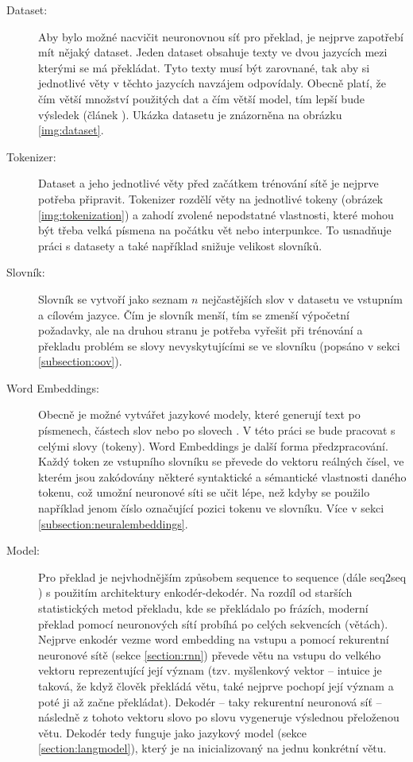 \begin{description}
  \item[Dataset:] Aby bylo možné nacvičit neuronovnou síť pro překlad, je nejprve zapotřebí mít nějaký dataset. Jeden dataset obsahuje texty ve dvou jazycích mezi kterými se má překládat. Tyto texty musí být zarovnané, tak aby si jednotlivé věty v těchto jazycích navzájem odpovídaly. Obecně platí, že čím větší množství použitých dat a čím větší model, tím lepší bude výsledek (článek \cite{googleLimits}). Ukázka datasetu je znázorněna na obrázku \ref{img:dataset}.

  \item[Tokenizer:] Dataset a jeho jednotlivé věty před začátkem trénování sítě je nejprve potřeba připravit. Tokenizer rozdělí věty na jednotlivé tokeny (obrázek \ref{img:tokenization}) a zahodí zvolené nepodstatné vlastnosti, které mohou být třeba velká písmena na počátku vět nebo interpunkce. To usnadňuje práci s datasety a také například snižuje velikost slovníků.

  \item[Slovník:] Slovník se vytvoří jako seznam $n$ nejčastějších slov v datasetu ve vstupním a cílovém jazyce. Čím je slovník menší, tím se zmenší výpočetní požadavky, ale na druhou stranu je potřeba vyřešit při trénování a překladu problém se slovy nevyskytujícími se ve slovníku (popsáno v sekci \ref{subsection:oov}).

  \item[Word Embeddings:] Obecně je možné vytvářet jazykové modely, které generují text po písmenech, částech slov nebo po slovech \cite{mikolovSubwords}. V této práci se bude pracovat s celými slovy (tokeny). Word Embeddings je další forma předzpracování. Každý token ze vstupního slovníku se převede do vektoru reálných čísel, ve kterém jsou zakódovány některé syntaktické a sémantické vlastnosti daného tokenu, což umožní neuronové síti se učit lépe, než kdyby se použilo například jenom číslo označující pozici tokenu ve slovníku. Více v sekci \ref{subsection:neuralembeddings}.

  \item[Model:] Pro překlad je nejvhodnějším způsobem sequence to sequence (dále seq2seq \cite{seq2seq}) s použitím architektury enkodér-dekodér. Na rozdíl od starších statistických metod překladu, kde se překládalo po frázích, moderní překlad pomocí neuronových sítí probíhá po celých sekvencích (větách). Nejprve enkodér vezme word embedding na vstupu a pomocí rekurentní neuronové sítě (sekce \ref{section:rnn}) převede větu na vstupu do velkého vektoru reprezentující její význam (tzv. myšlenkový vektor -- intuice je taková, že když člověk překládá větu, také nejprve pochopí její význam a poté ji až začne překládat). Dekodér -- taky rekurentní neuronová síť -- následně z tohoto vektoru slovo po slovu vygeneruje výslednou přeloženou větu. Dekodér tedy funguje jako jazykový model (sekce \ref{section:langmodel}), který je na inicializovaný na jednu konkrétní větu.
\end{description}


